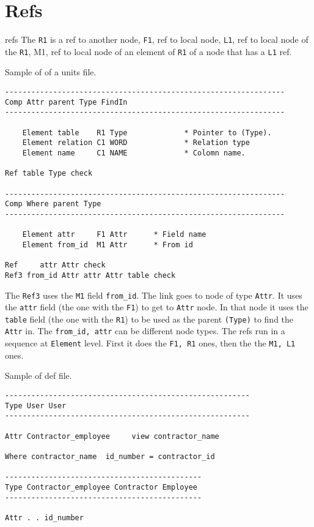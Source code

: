 \documentclass[11pt]{article}
\begin{document}
\section{Refs}
refs
The \texttt{R1} is a ref to another node, \texttt{F1}, ref to local
node, \texttt{L1}, ref to local node of the \texttt{R1}, M1, ref to
local node of an element of \texttt{R1} of a node that has a \texttt{L1}
ref.

Sample of of a units file.

\begin{verbatim}
----------------------------------------------------------------
Comp Attr parent Type FindIn
----------------------------------------------------------------

    Element table    R1 Type             * Pointer to (Type).
    Element relation C1 WORD             * Relation type
    Element name     C1 NAME             * Colomn name.

Ref table Type check

----------------------------------------------------------------
Comp Where parent Type
----------------------------------------------------------------

    Element attr     F1 Attr      * Field name
    Element from_id  M1 Attr      * From id

Ref     attr Attr check
Ref3 from_id Attr attr Attr table check
\end{verbatim}

The \texttt{Ref3} uses the \texttt{M1} field \texttt{from\_id}. The link
goes to node of type \texttt{Attr}. It uses the \texttt{attr} field (the
one with the \texttt{F1}) to get to \texttt{Attr} node. In that node it
uses the \texttt{table} field (the one with the \texttt{R1}) to be used
as the parent \texttt{(Type)} to find the \texttt{Attr} in. The
\texttt{from\_id,\ attr} can be different node types. The refs run in a
sequence at \texttt{Element} level. First it does the \texttt{F1,\ R1}
ones, then the the \texttt{M1,\ L1} ones.

Sample of def file.

\begin{verbatim}
--------------------------------------------------------
Type User User
--------------------------------------------------------

Attr Contractor_employee     view contractor_name

Where contractor_name  id_number = contractor_id

---------------------------------------------
Type Contractor_employee Contractor Employee
---------------------------------------------

Attr . . id_number
\end{verbatim}
\end{document}
